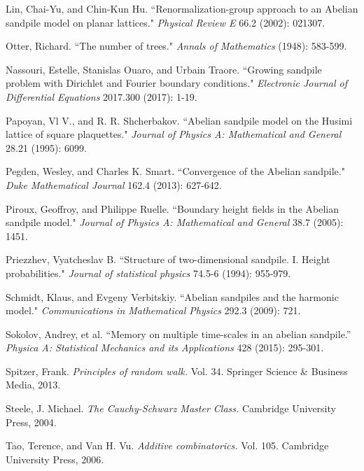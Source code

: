 \documentclass[a4paper, 12pt, notitlepage]{amsart}
\theoremstyle{remark}
\begin{document}
\begin{thebibliography}{1}
Lin, Chai-Yu, and Chin-Kun Hu. 
\newblock ``Renormalization-group approach to an Abelian sandpile model on planar lattices." 
\newblock \emph{Physical Review E} 66.2 (2002): 021307.


Otter, Richard. 
\newblock ``The number of trees." \emph{Annals of Mathematics} (1948): 583-599.

Nassouri, Estelle, Stanislas Ouaro, and Urbain Traore. 
\newblock ``Growing sandpile problem with Dirichlet and Fourier boundary conditions." 
\newblock \emph{Electronic Journal of Differential Equations} 2017.300 (2017): 1-19.

Papoyan, Vl V., and R. R. Shcherbakov. 
\newblock ``Abelian sandpile model on the Husimi lattice of square plaquettes." 
\newblock \emph{Journal of Physics A: Mathematical and General} 28.21 (1995): 6099.

Pegden, Wesley, and Charles K. Smart. 
\newblock ``Convergence of the Abelian sandpile."
\newblock \emph{Duke Mathematical Journal} 162.4 (2013): 627-642.

Piroux, Geoffroy, and Philippe Ruelle. 
\newblock ``Boundary height fields in the Abelian sandpile model."
\newblock \emph{Journal of Physics A: Mathematical and General} 38.7 (2005): 1451.

Priezzhev, Vyatcheslav B. 
\newblock ``Structure of two-dimensional sandpile. I. Height probabilities." 
\newblock \emph{Journal of statistical physics} 74.5-6 (1994): 955-979.

Schmidt, Klaus, and Evgeny Verbitskiy. 
\newblock ``Abelian sandpiles and the harmonic model."
\newblock \emph{Communications in Mathematical Physics} 292.3 (2009): 721.


Sokolov, Andrey, et al. 
\newblock ``Memory on multiple time-scales in an abelian sandpile.'' 
\newblock \emph{Physica A: Statistical Mechanics and its Applications} 428 (2015): 295-301.

Spitzer, Frank. 
\newblock \emph{Principles of random walk.} 
\newblock Vol. 34. Springer Science \& Business Media, 2013.

Steele, J. Michael. 
\newblock \emph{The Cauchy-Schwarz Master Class.} Cambridge University Press, 2004.

Tao, Terence, and Van H. Vu. 
\newblock \emph{Additive combinatorics.} Vol. 105. Cambridge University Press, 2006.

\end{thebibliography}
\end{document}
